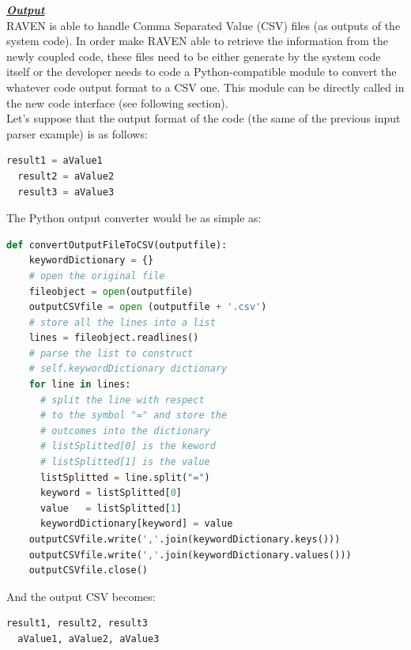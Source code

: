 \textbf{\textit{\underline{Output}}}
\newline
\\RAVEN is able to handle Comma Separated Value (CSV) files (as outputs 
of the system code). In order make RAVEN able to retrieve the information
 from the newly coupled code, these files need to be  either generate by the 
 system code itself or the developer needs to code a Python-compatible 
module to convert the whatever code output format to a CSV one. 
This module can be  directly called in the new code interface (see following section).
\\ Let's suppose that the output format of the code (the same of the previous 
input parser example) is as follows:
\begin{lstlisting}[language=python]
  result1 = aValue1
  result2 = aValue2
  result3 = aValue3
\end{lstlisting} 
The Python output converter would be as simple as:
\begin{lstlisting}[language=python]
def convertOutputFileToCSV(outputfile):
    keywordDictionary = {}
    # open the original file
    fileobject = open(outputfile)
    outputCSVfile = open (outputfile + '.csv')
    # store all the lines into a list
    lines = fileobject.readlines()
    # parse the list to construct 
    # self.keywordDictionary dictionary
    for line in lines:
      # split the line with respect
      # to the symbol "=" and store the
      # outcomes into the dictionary
      # listSplitted[0] is the keword
      # listSplitted[1] is the value
      listSplitted = line.split("=")
      keyword = listSplitted[0]
      value   = listSplitted[1]
      keywordDictionary[keyword] = value
    outputCSVfile.write(','.join(keywordDictionary.keys()))
    outputCSVfile.write(','.join(keywordDictionary.values()))
    outputCSVfile.close()
\end{lstlisting} 
And the output CSV becomes:
\begin{lstlisting}[language=python]
  result1, result2, result3
  aValue1, aValue2, aValue3 
\end{lstlisting} 
